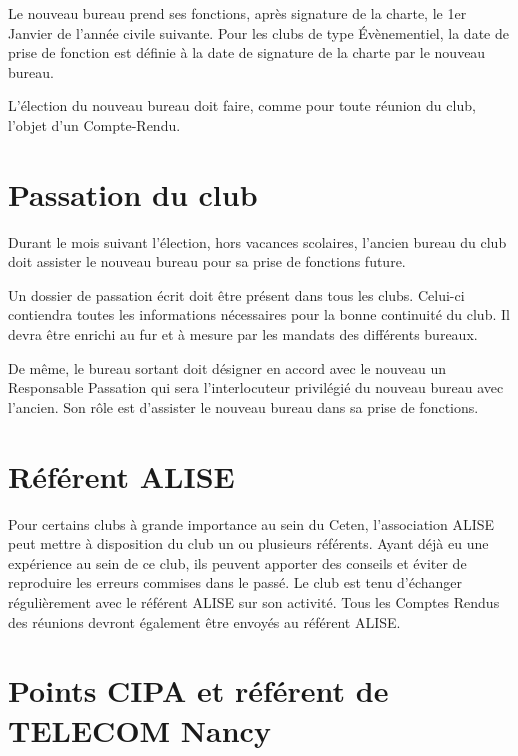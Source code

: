 \documentclass{article} %
\begin{document}
\begin{multicols}{2}
{			Le nouveau bureau prend ses fonctions, après signature de
			la charte, le 1er Janvier de l’année civile suivante. Pour les
			clubs de type Évènementiel, la date de prise de fonction est
			définie à la date de signature de la charte par le nouveau
			bureau.

			L’élection du nouveau bureau doit faire, comme pour toute
			réunion du club, l’objet d’un Compte-Rendu.

		}
		
		\section{Passation du club}

		{\small

			Durant le mois suivant l’élection, hors vacances scolaires,
			l’ancien bureau du club doit assister le nouveau bureau pour
			sa prise de fonctions future.

			Un dossier de passation écrit doit être présent dans tous les
			clubs. Celui-ci contiendra toutes les informations
			nécessaires pour la bonne continuité du club. Il devra être
			enrichi au fur et à mesure par les mandats des différents
			bureaux.

			De même, le bureau sortant doit désigner en accord avec le
			nouveau un Responsable Passation qui sera l’interlocuteur
			privilégié du nouveau bureau avec l’ancien. Son rôle est
			d’assister le nouveau bureau dans sa prise de fonctions.

		}
		
		\section{Référent ALISE}

		{\small

			Pour certains clubs à grande importance au sein du Ceten,
			l’association ALISE peut mettre à disposition du club un ou
			plusieurs référents. Ayant déjà eu une expérience au sein de
			ce club, ils peuvent apporter des conseils et éviter de
			reproduire les erreurs commises dans le passé. Le club est
			tenu d’échanger régulièrement avec le référent ALISE sur
			son activité. Tous les Comptes Rendus des réunions devront
			également être envoyés au référent ALISE\@.

		}
		
		\section{Points CIPA et référent de TELECOM Nancy}


\end{multicols}
\end{document}
